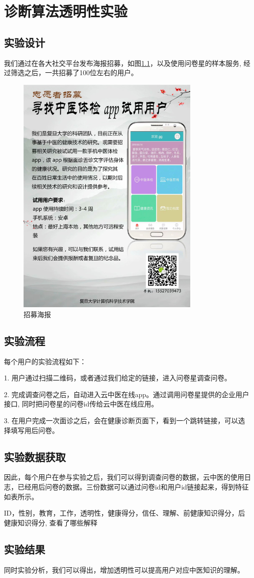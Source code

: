 \chapter{诊断算法透明性实验}

\section{实验设计}
我们通过在各大社交平台发布海报招募，如图\ref{fig:poster}，以及使用问卷星的样本服务, 经过筛选之后，一共招募了100位左右的用户。
\begin{figure}[htb]
    \centering
    \includegraphics[height=12cm]{images/poster.png}
    \caption{招募海报}
    \label{fig:poster}
\end{figure}
\section{实验流程}
每个用户的实验流程如下：

1. 用户通过扫描二维码，或者通过我们给定的链接，进入问卷星调查问卷。

2. 完成调查问卷之后，自动进入云中医在线app。通过调用问卷星提供的企业用户接口, 同时把问卷星的问卷id传给云中医在线应用。

3. 在用户完成一次面诊之后，会在健康诊断页面下，看到一个跳转链接，可以选择填写用后问卷。



\section{实验数据获取}
因此，每个用户在参与实验之后，我们可以得到调查问卷的数据，云中医的使用日志，已经用后问卷的数据。三份数据可以通过问卷id和用户id链接起来，得到特征如表所示。

ID，性别，教育，工作，透明性，健康得分，信任、理解、前健康知识得分，后健康知识得分, 查看了哪些解释

\section{实验结果}
同时实验分析，我们可以得出，增加透明性可以提高用户对应中医知识的理解。



